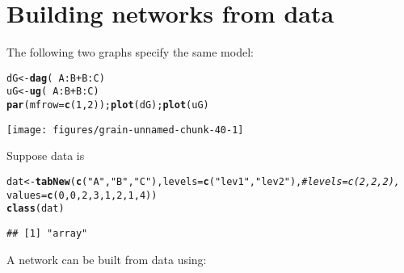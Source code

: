 \documentclass[10pt]{article}\usepackage[]{graphicx}\usepackage[]{xcolor}
\makeatletter
\def\maxwidth{ %
  \ifdim\Gin@nat@width>\linewidth
    \linewidth
  \else
    \Gin@nat@width
  \fi
}
\newcommand{\hlnum}[1]{\textcolor[rgb]{0.686,0.059,0.569}{#1}}%
\newcommand{\hlstr}[1]{\textcolor[rgb]{0.192,0.494,0.8}{#1}}%
\newcommand{\hlcom}[1]{\textcolor[rgb]{0.678,0.584,0.686}{\textit{#1}}}%
\newcommand{\hlopt}[1]{\textcolor[rgb]{0,0,0}{#1}}%
\newcommand{\hlstd}[1]{\textcolor[rgb]{0.345,0.345,0.345}{#1}}%
\newcommand{\hlkwb}[1]{\textcolor[rgb]{0.69,0.353,0.396}{#1}}%
\newcommand{\hlkwc}[1]{\textcolor[rgb]{0.333,0.667,0.333}{#1}}%
\newcommand{\hlkwd}[1]{\textcolor[rgb]{0.737,0.353,0.396}{\textbf{#1}}}%
\newenvironment{kframe}{%
 \def\at@end@of@kframe{}%
 \ifinner\ifhmode%
  \def\at@end@of@kframe{\end{minipage}}%
  \begin{minipage}{\columnwidth}%
 \fi\fi%
 \def\FrameCommand##1{\hskip\@totalleftmargin \hskip-\fboxsep
 \colorbox{shadecolor}{##1}\hskip-\fboxsep
     \hskip-\linewidth \hskip-\@totalleftmargin \hskip\columnwidth}%
 \MakeFramed {\advance\hsize-\width
   \@totalleftmargin\z@ \linewidth\hsize
   \@setminipage}}%
 {\par\unskip\endMakeFramed%
 \at@end@of@kframe}
\newenvironment{knitrout}{}{} %
\makeatother
\begin{document}
\appendix

\section{Building networks from data}
\label{sec:using-textttsm-argum}

The following two graphs specify the same model:
\begin{knitrout}
\color{fgcolor}\begin{kframe}
\begin{alltt}
\hlstd{dG}  \hlkwb{<-} \hlkwd{dag}\hlstd{(}\hlopt{~}\hlstd{A}\hlopt{:}\hlstd{B} \hlopt{+} \hlstd{B}\hlopt{:}\hlstd{C)}
\hlstd{uG}  \hlkwb{<-} \hlkwd{ug}\hlstd{(}\hlopt{~}\hlstd{A}\hlopt{:}\hlstd{B} \hlopt{+} \hlstd{B}\hlopt{:}\hlstd{C)}
\hlkwd{par}\hlstd{(}\hlkwc{mfrow}\hlstd{=}\hlkwd{c}\hlstd{(}\hlnum{1}\hlstd{,}\hlnum{2}\hlstd{));} \hlkwd{plot}\hlstd{( dG );} \hlkwd{plot}\hlstd{( uG )}
\end{alltt}
\end{kframe}
\texttt{[image: figures/grain-unnamed-chunk-40-1]} 
\end{knitrout}

Suppose data is
\begin{knitrout}
\color{fgcolor}\begin{kframe}
\begin{alltt}
\hlstd{dat} \hlkwb{<-} \hlkwd{tabNew}\hlstd{(}\hlkwd{c}\hlstd{(}\hlstr{"A"}\hlstd{,} \hlstr{"B"}\hlstd{,} \hlstr{"C"}\hlstd{),} \hlkwc{levels}\hlstd{=}\hlkwd{c}\hlstd{(}\hlstr{"lev1"}\hlstd{,} \hlstr{"lev2"}\hlstd{),} \hlcom{#levels=c(2,2,2),}
              \hlkwc{values}\hlstd{=}\hlkwd{c}\hlstd{(}\hlnum{0}\hlstd{,} \hlnum{0}\hlstd{,} \hlnum{2}\hlstd{,} \hlnum{3}\hlstd{,} \hlnum{1}\hlstd{,} \hlnum{2}\hlstd{,} \hlnum{1}\hlstd{,} \hlnum{4}\hlstd{))}
\hlkwd{class}\hlstd{(dat)}
\end{alltt}
\begin{verbatim}
## [1] "array"
\end{verbatim}
\end{kframe}
\end{knitrout}

A network can be built from data using:
\end{document}
